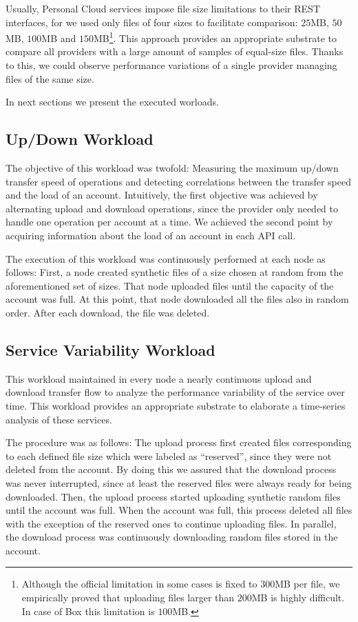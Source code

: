 Usually, Personal Cloud services impose file size 
limitations to their REST interfaces, for
we used only files of four sizes to facilitate comparison: $25$MB, $50$MB, 
$100$MB and $150$MB\footnote{Although the official limitation in some cases is fixed
to $300$MB per file, we empirically proved that uploading files
larger than $200$MB is highly difficult. In case of Box this limitation
is $100$MB.}. This approach provides an appropriate substrate 
to compare all providers with a large amount of samples of equal-size files.
Thanks to this, we could observe performance variations of a single provider
managing files of the same size.

In next sections we present the executed worloads.

\subsection{Up/Down Workload}
The objective of this workload
was twofold: Measuring the maximum up/down transfer speed of operations
and detecting correlations between the transfer speed and the load
of an account. Intuitively, the first objective was achieved by alternating upload
and download operations, since the provider only needed to handle one 
operation per account at a time. We achieved the second point
by acquiring information about the load of an account in each API call.

The execution of this workload was continuously performed
at each node as follows: First, a node created synthetic 
files of a size chosen at random from the aforementioned set of sizes.
That node uploaded files until the capacity of the account was full.
At this point, that node downloaded all the files also in random order.
After each download, the file was deleted. 

\subsection{Service Variability Workload}
This workload maintained 
in every node a nearly continuous upload and download transfer flow to analyze the performance 
variability of the service over time. This workload provides an
appropriate substrate to elaborate a time-series analysis of these services.

The procedure was as follows: The upload process first
created files corresponding to each defined file size which
were labeled as ``reserved'', since they were not deleted from the account.
By doing this we assured that the download process was never interrupted,
since at least the reserved files were always ready for being downloaded.
Then, the upload process started uploading synthetic 
random files until the account was full. When the account was full,
this process deleted all files with the exception of the reserved ones
to continue uploading files.
In parallel, the download process was continuously downloading random files
stored in the account. 
 
